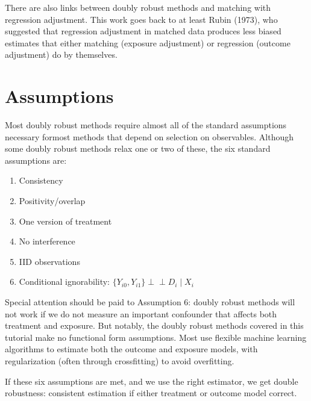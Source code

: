 \documentclass[letterpaper,10pt,english]{jupyterBook}
\begin{document}
\sphinxAtStartPar
There are also links between doubly robust methods and matching with regression adjustment. This work goes back to at least Rubin (1973), who suggested that regression adjustment in matched data produces less biased estimates that either matching (exposure adjustment) or regression (outcome adjustment) do by themselves.


\section{Assumptions}
\label{\detokenize{Introduction and Conceptual Overview:assumptions}}
\sphinxAtStartPar
Most doubly robust methods require almost all of the standard assumptions necessary formost methods that depend on selection on observables. Although some doubly robust methods relax one or two of these, the six standard assumptions are:
\begin{enumerate}
%
\item {} 
\sphinxAtStartPar
Consistency

\item {} 
\sphinxAtStartPar
Positivity/overlap

\item {} 
\sphinxAtStartPar
One version of treatment

\item {} 
\sphinxAtStartPar
No interference

\item {} 
\sphinxAtStartPar
IID observations

\item {} 
\sphinxAtStartPar
Conditional ignorability: \(\{Y_{i0}, Y_{i1}\} \perp \!\!\! \perp D_i \mid X_i\)

\end{enumerate}

\sphinxAtStartPar
Special attention should be paid to Assumption 6: doubly robust methods will not work if we do not measure an important confounder that affects both treatment and exposure. But notably, the doubly robust methods covered in this tutorial make no functional form assumptions. Most use flexible machine learning algorithms to estimate both the outcome and exposure models, with regularization (often through cross\sphinxhyphen{}fitting) to avoid overfitting.

\sphinxAtStartPar
If these six assumptions are met, and we use the right estimator, we get double robustness: consistent estimation if either treatment or outcome model correct.
\end{document}
